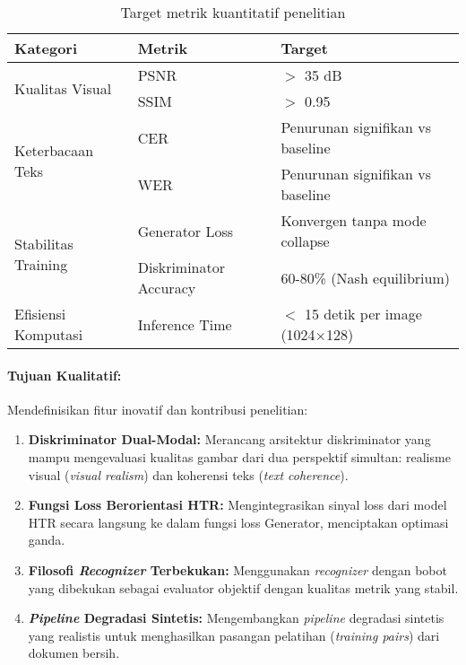 \documentclass[12pt,a4paper]{article}
\begin{document}
\begin{table}[H]
\centering
\caption{Target metrik kuantitatif penelitian}
\label{tab:target-metrik}
\small
\begin{tabular}{|l|l|l|}
\hline
\textbf{Kategori} & \textbf{Metrik} & \textbf{Target} \\ \hline
\multirow{2}{*}{Kualitas Visual} & PSNR & $>$ 35 dB \\ \cline{2-3}
 & SSIM & $>$ 0.95 \\ \hline
\multirow{2}{*}{Keterbacaan Teks} & CER & Penurunan signifikan vs baseline \\ \cline{2-3}
 & WER & Penurunan signifikan vs baseline \\ \hline
\multirow{2}{*}{Stabilitas Training} & Generator Loss & Konvergen tanpa mode collapse \\ \cline{2-3}
 & Diskriminator Accuracy & 60-80\% (Nash equilibrium) \\ \hline
Efisiensi Komputasi & Inference Time & $<$ 15 detik per image (1024$\times$128) \\ \hline
\end{tabular}
\end{table}

\paragraph{Tujuan Kualitatif:}

Mendefinisikan fitur inovatif dan kontribusi penelitian:

\begin{enumerate}[leftmargin=*, nosep]
\item \textbf{Diskriminator Dual-Modal:} Merancang arsitektur diskriminator yang mampu mengevaluasi kualitas gambar dari dua perspektif simultan: realisme visual (\textit{visual realism}) dan koherensi teks (\textit{text coherence}).

\item \textbf{Fungsi Loss Berorientasi HTR:} Mengintegrasikan sinyal loss dari model HTR secara langsung ke dalam fungsi loss Generator, menciptakan optimasi ganda.

\item \textbf{Filosofi \textit{Recognizer} Terbekukan:} Menggunakan \textit{recognizer} dengan bobot yang dibekukan sebagai evaluator objektif dengan kualitas metrik yang stabil.

\item \textbf{\textit{Pipeline} Degradasi Sintetis:} Mengembangkan \textit{pipeline} degradasi sintetis yang realistis untuk menghasilkan pasangan pelatihan (\textit{training pairs}) dari dokumen bersih.
\end{enumerate}
\end{document}
